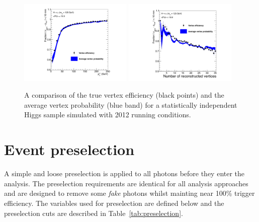 \begin{figure}
  \includegraphics[width=0.48\textwidth]{analysis_comps/plots/vtxProbPt.pdf}
  \includegraphics[width=0.48\textwidth]{analysis_comps/plots/vtxProbNvtx.pdf}
  \caption[A comparison of the true vertex efficiency and the average vertex probability]{A comparison of the true vertex efficiency (black points) and the average vertex probability (blue band) for a statistically independent \MC Higgs sample simulated with 2012 running conditions.}
  \label{fig:vertex_bdt_prob_efficiency}
\end{figure}

\section{Event preselection}
\label{sec:photon_presel}

A simple and loose preselection is applied to all photons before they enter the analysis. The preselection requirements are identical for all analysis approaches and are designed to remove some \emph{fake} photons whilst mainting near 100\% trigger efficiency. The variables used for preselection are defined below and the preselection cuts are described in Table~\ref{tab:preselection}.


